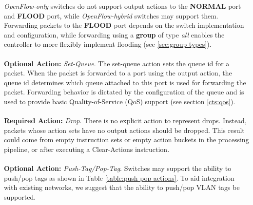 \documentclass[10pt]{article}
\begin{document}
\emph{OpenFlow-only} switches do not support output actions to the \textbf{NORMAL} port and \textbf{FLOOD} port, while \emph{OpenFlow-hybrid} switches may support them. Forwarding packets to the \textbf{FLOOD} port depends on the switch implementation and configuration, while forwarding using a \textbf{group} of type \textit{all} enables the controller to more flexibly implement flooding (see \ref{sec:group types}).
\\\\
\textbf{Optional Action:} \emph{Set-Queue}. The set-queue action sets the queue id for a packet. When the packet is forwarded to a port using the output action, the queue id determines which queue attached to this port is used for forwarding the packet. Forwarding behavior is dictated by the configuration of the queue and is used to provide basic Quality-of-Service (QoS) support (see section \ref{cts:qos}).
\\\\
\textbf{Required Action:} \emph{Drop}.  There is no explicit action to represent drops.  Instead, packets whose action sets have no output actions should be dropped.  This result could come from empty instruction sets or empty action buckets in the processing pipeline, or after executing a Clear-Actions instruction.
\\\\
\textbf{Optional Action:} \emph{Push-Tag/Pop-Tag}.  Switches may support the ability to push/pop tags as shown in Table \ref{table:push pop actions}.  To aid integration with existing networks, we suggest that the ability to push/pop VLAN tags be supported.
\end{document}

